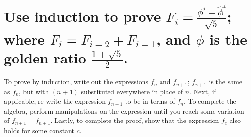 \section[Problem 2]{Use induction to prove $F_i = \frac{\phi^i - \hat{\phi}^i}{\sqrt{5}}$; where $F_i = F_{i-2} + F_{i-1}$, and $\phi$ is the golden ratio $\frac{1 + \sqrt{5}}{2}$.}

To prove by induction, write out the expressions $f_n$ and $f_{n + 1}$; $f_{n + 1}$ is the same as $f_n$, but with $(n + 1)$ substituted everywhere in place of $n$. Next, if applicable, re-write the expression $f_{n + 1}$ to be in terms of $f_n$. To complete the algebra, perform manipulations on the expression until you reach some variation of $f_{n + 1} = f_{n + 1}$.  Lastly, to complete the proof, show that the expression $f_c$ also holds for some constant $c$. 


